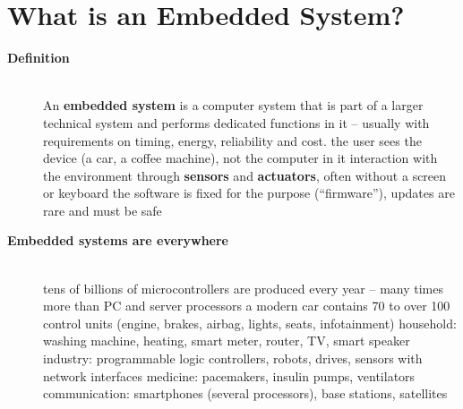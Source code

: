 \section{What is an Embedded System?}
\begin{description}
\item[{\rot\bf Definition}]~\\
{An \textbf{embedded system} is a computer system that is part of a larger technical system and performs dedicated functions in it -- usually with requirements on timing, energy, reliability and cost.}
\bi
	\ite the user sees the device (a car, a coffee machine), not the computer in it
	\ite interaction with the environment through \textbf{sensors} and \textbf{actuators}, often without a screen or keyboard
	\ite the software is fixed for the purpose (``firmware''), updates are rare and must be safe
\ei
\os{\newpage}

\item[{\rot\bf Embedded systems are everywhere}]~\\[-\lblskip]
\bi
	\ite tens of billions of microcontrollers are produced every year -- many times more than PC and server processors
	\ite a modern car contains 70 to over 100 control units (engine, brakes, airbag, lights, seats, infotainment)
	\ite household: washing machine, heating, smart meter, router, TV, smart speaker
	\ite industry: programmable logic controllers, robots, drives, sensors with network interfaces
	\ite medicine: pacemakers, insulin pumps, ventilators
	\ite communication: smartphones (several processors), base stations, satellites
\ei
\os{\newpage}


\end{description}
